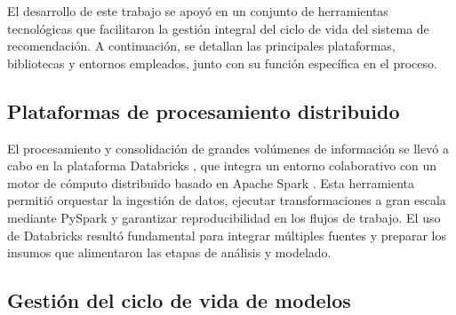 


El desarrollo de este trabajo se apoyó en un conjunto de herramientas tecnológicas que facilitaron la gestión integral del ciclo de vida del sistema de recomendación. A continuación, se detallan las principales plataformas, bibliotecas y entornos empleados, junto con su función específica en el proceso.

\subsection{Plataformas de procesamiento distribuido}

El procesamiento y consolidación de grandes volúmenes de información se llevó a cabo en la plataforma Databricks \cite{ARTICLE:Databricks}, que integra un entorno colaborativo con un motor de cómputo distribuido basado en Apache Spark \cite{ARTICLE:Spark2012}. Esta herramienta permitió orquestar la ingestión de datos, ejecutar transformaciones a gran escala mediante PySpark y garantizar reproducibilidad en los flujos de trabajo. El uso de Databricks resultó fundamental para integrar múltiples fuentes y preparar los insumos que alimentaron las etapas de análisis y modelado.

\subsection{Gestión del ciclo de vida de modelos}

